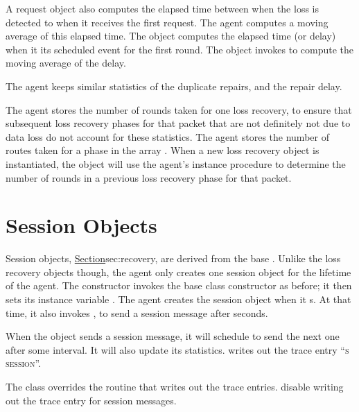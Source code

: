 {A request object also computes the elapsed time between 
when the loss is detected to when it receives the first request.
The agent computes a moving average of this elapsed time.
The object computes the elapsed time (or delay) when it
its scheduled event for the first round.
The object invokes
to compute the moving average of the delay.

The agent keeps similar statistics of the duplicate repairs,
and the repair delay.

The agent stores the number of rounds taken for one loss recovery,
to ensure that subsequent loss recovery phases for that packet
that are not definitely not due to data loss
do not account for these statistics.
The agent stores the number of routes taken for a phase in
the array .
When a new loss recovery object is instantiated,
the object will use the agent's instance procedure
to determine the number of rounds in a previous loss recovery phase
for that packet.

\section{Session Objects}
\label{sec:session}

Session objects,
\href{like the loss recovery objects}{Section}{sec:recovery},
are derived from the base .
Unlike the loss recovery objects though,
the agent only creates one session object for the lifetime of the agent.
The constructor invokes the base class constructor as before;
it then sets its instance variable .
The agent creates the session object when it s.
At that time, it also invokes
,
to send a session message after  seconds.

When the object sends a session message,
it will schedule to send the next one after some interval.
It will also update its statistics.
writes out the trace entry ``\textsc{s session}''.

The class overrides the
 routine that writes out the trace entries.
disable writing out the trace entry for session messages.

}
